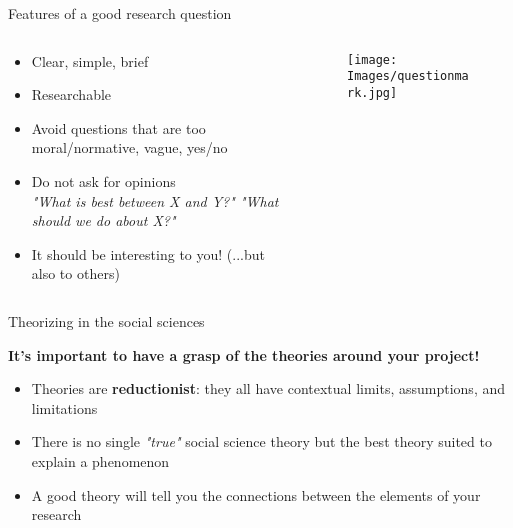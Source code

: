 \documentclass[10pt, aspectratio=169]{beamer}
\begin{document}
\begin{frame}{Features of a good research question}
\begin{columns}[T]
\begin{column}{0.6\textwidth}
\begin{itemize}
    \item Clear, simple, brief \vspace{0.3cm}
    \item Researchable \vspace{0.3cm}
    \item Avoid questions that are too moral/normative, vague, yes/no \vspace{0.3cm}
    \item Do not ask for opinions \\ \textit{"What is best between X and Y?" "What should we do about X?"} \vspace{0.3cm}
    \item It should be interesting to you! (...but also to others) \vspace{0.3cm}
\end{itemize}
\end{column}

\begin{column}{0.4\textwidth}
\begin{figure}
    \centering
    \texttt{[image: Images/questionmark.jpg]}
    \label{fig:enter-label}
\end{figure}
\end{column}
\end{columns}
\end{frame}


\begin{frame}{Theorizing in the social sciences}
\begin{center}
\textbf{It's important to have a grasp of the theories around your project!} 
\end{center}
    \begin{itemize}
        \item Theories are \textbf{reductionist}: they all have contextual limits, assumptions, and limitations \vspace{0.3cm}
        \item There is no single \textit{"true"} social science theory but the best theory suited to explain a phenomenon \vspace{0.3cm}
        \item A good theory will tell you the connections between the elements of your research \vspace{0.3cm}
    \end{itemize}
\end{frame}
\end{document}
